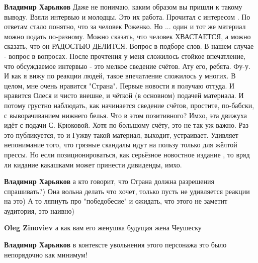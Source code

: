 \begin{itemize}
\begin{itemize}
\textbf{Владимир Харьяков} Даже не понимаю, каким образом вы пришли к такому
выводу. Взяли интервью и молодцы. Это их работа. Прочитал с интересом . По
ответам стало понятно, что за человек Роженко. Но ... один и тот же материал
можно подать по-разному. Можно сказать, что человек ХВАСТАЕТСЯ, а можно
сказать, что он РАДОСТЬЮ ДЕЛИТСЯ. Вопрос в подборе слов. В нашем случае -
вопрос в вопросах. После прочтения у меня сложилось стойкое впечатление, что
обсуждаемое интервью - это мелкое сведение счётов. Ату его, ребята. Фу-у. И как
я вижу по реакции людей, такое впечатление сложилось у многих. В целом, мне
очень нравится "Страна". Первые новости я получаю оттуда. И нравится Олеся и
чисто внешне, и чёткой (в основном) подачей материала. И потому грустно
наблюдать, как начинается сведение счётов, простите, по-бабски, с
выворачиванием нижнего белья. Что в этом позитивного? Имхо, эта движуха идёт с
подачи С. Крюковой. Хотя по большому счёту, это не так уж важно. Раз это
публикуется, то и Гужву такой материал, выходит, устраивает. Удивляет
непонимание того, что грязные скандалы идут на пользу только для жёлтой прессы.
Но если позиционироваться, как серьёзное новостное издание , то вряд ли кидание
какашками может принести дивиденды, имхо.

 
\textbf{Владимир Харьяков} а кто говорит, что Страна должна разрешения спрашивать?) Она вольна делать что хочет, только пусть не удивляется реакции на это) А то ляпнуть про "победобесие" и ожидать, что этого не заметит аудитория, это наивно)

 
\textbf{Oleg Zinoviev} а как вам его женушка будущая жена Чеушеску

 
\textbf{Владимир Харьяков} в контексте увольнения этого персонажа это было непорядочно как минимум!


\end{itemize}
\end{itemize}
